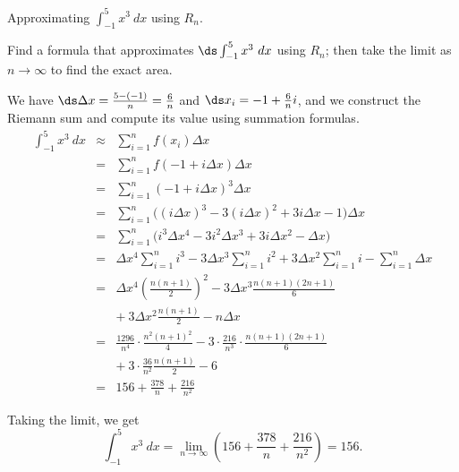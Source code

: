 \begin{marginfigure} %
\caption{Approximating $\int_{-1}^5 x^3\ dx$ using $R_n$.} \label{fig:apex_5-3_Area3R}
\end{marginfigure}

\begin{example} %
Find a formula that approximates $\ds \int_{-1}^5 x^3 \ dx$ using $R_n$; then take the limit as $n \to \infty$ to find the exact area.

\solution We have $\ds \Delta x = \frac{5-(-1)}{n} = \frac{6}{n}$ and $\ds x_i = -1 + \frac{6}{n}i$,
and we construct the Riemann sum and compute its value using summation formulas.
\begin{eqnarray*}
\int_{-1}^5 x^3\ dx 	& \approx & \sum_{i=1}^n f(x_i) \Delta x \\
&=& \sum_{i=1}^n f(-1+i\Delta x)\Delta x \\
&=& \sum_{i=1}^n (-1+i\Delta x)^3\Delta x \\
&=& \sum_{i=1}^n \big((i\Delta x)^3 -3(i\Delta x)^2 + 3i\Delta x -1\big)\Delta x \\
&=& \sum_{i=1}^n \big(i^3\Delta x^4 - 3i^2\Delta x^3 + 3i\Delta x^2 -\Delta x\big) \\
&=& \Delta x^4 \sum_{i=1}^ni^3 -3\Delta x^3 \sum_{i=1}^n i^2+ 3\Delta x^2 \sum_{i=1}^n i - \sum_{i=1}^n \Delta x \\
&=& \Delta x^4 \left(\frac{n(n+1)}{2}\right)^2 -3\Delta x^3 \frac{n(n+1)(2n+1)}{6} \\
& & + \ 3 \Delta x^2 \frac{n(n+1)}{2} - n \Delta x \\
&=& \frac{1296}{n^4}\cdot\frac{n^2(n+1)^2}{4} - 3\cdot\frac{216}{n^3}\cdot\frac{n(n+1)(2n+1)}{6} \\
&& + \ 3\cdot\frac{36}{n^2}\frac{n(n+1)}2 -6 \\
&=&156 + \frac{378}n + \frac{216}{n^2}
\end{eqnarray*}


Taking the limit, we get
\[ \int_{-1}^{5} x^3\ dx = \lim_{n \to \infty} \left( 156 + \frac{378}n + \frac{216}{n^2} \right) = 156.\]
\end{example}